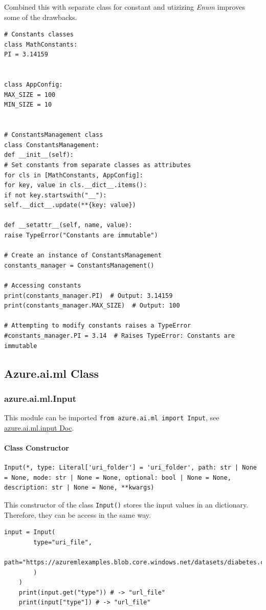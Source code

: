 Combined this with separate class for constant and utizizing \textit{Enum} improves some of the drawbacks.
\begin{lstlisting}[style=Python, caption={Installing Azure ML SDK core package},captionpos=b]
# Constants classes
class MathConstants:
PI = 3.14159


class AppConfig:
MAX_SIZE = 100
MIN_SIZE = 10


# ConstantsManagement class
class ConstantsManagement:
def __init__(self):
# Set constants from separate classes as attributes
for cls in [MathConstants, AppConfig]:
for key, value in cls.__dict__.items():
if not key.startswith("__"):
self.__dict__.update(**{key: value})

def __setattr__(self, name, value):
raise TypeError("Constants are immutable")

# Create an instance of ConstantsManagement
constants_manager = ConstantsManagement()

# Accessing constants
print(constants_manager.PI)  # Output: 3.14159
print(constants_manager.MAX_SIZE)  # Output: 100

# Attempting to modify constants raises a TypeError
#constants_manager.PI = 3.14  # Raises TypeError: Constants are immutable
\end{lstlisting}


\subsection{Azure.ai.ml Class}
\subsubsection{azure.ai.ml.Input}\label{subsec:azure-ai-ml-Input}
This module can be imported \verb+from azure.ai.ml import Input+, see \href{https://learn.microsoft.com/de-de/python/api/azure-ai-ml/azure.ai.ml.input?view=azure-python}{azure.ai.ml.input Doc}.
\paragraph{Class Constructor}
\begin{lstlisting}[language=iPython,  caption={Konstrukor},captionpos=b]
	Input(*, type: Literal['uri_folder'] = 'uri_folder', path: str | None = None, mode: str | None = None, optional: bool | None = None, description: str | None = None, **kwargs)
\end{lstlisting}
This constructor of the class \verb+Input()+ stores the input values in an dictionary. Therefore, they can be access in the same way.
\begin{lstlisting}[language=iPython,  caption={Exmample Usage Input()},captionpos=b]
	input = Input(
		type="uri_file",
		path="https://azuremlexamples.blob.core.windows.net/datasets/diabetes.csv",
		)
	)
	print(input.get("type")) # -> "url_file"
	print(input["type"]) # -> "url_file"
\end{lstlisting}

